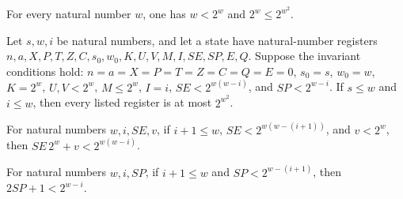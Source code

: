 \begin{lemma}
\label{Complexity.LogProg.SavitchARM.size_facts}
\leanok
{}
For every natural number $w$, one has $w<2^w$ and $2^w\le 2^{w^2}$.
\end{lemma}

\begin{lemma}
\label{Complexity.LogProg.SavitchARM.Inv.bd}
\leanok
{}
Let $s,w,i$ be natural numbers, and let a state have natural-number registers
$n,a,X,P,T,Z,C,s_0,w_0,K,U,V,M,I,SE,SP,E,Q$. Suppose the invariant conditions hold:
$n=a=X=P=T=Z=C=Q=E=0$, $s_0=s$, $w_0=w$, $K=2^w$, $U,V<2^w$, $M\le 2^w$, $I=i$,
$SE<2^{w(w-i)}$, and $SP<2^{w-i}$. If $s\le w$ and $i\le w$, then every listed register
is at most $2^{w^2}$.
\end{lemma}

\begin{lemma}
\label{Complexity.LogProg.SavitchARM.push_lt}
\leanok
{}
For natural numbers $w,i,SE,v$, if $i+1\le w$, $SE<2^{w(w-(i+1))}$, and $v<2^w$, then
$SE\,2^w+v<2^{w(w-i)}$.
\end{lemma}

\begin{lemma}
\label{Complexity.LogProg.SavitchARM.pushP_lt}
\leanok
{}
For natural numbers $w,i,SP$, if $i+1\le w$ and $SP<2^{w-(i+1)}$, then $2SP+1<2^{w-i}$.
\end{lemma}

